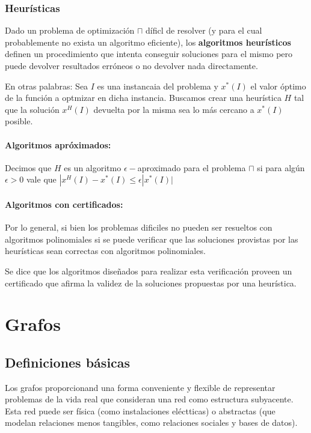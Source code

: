 \subsubsection{Heurísticas}
Dado un problema de optimización \(\sqcap\) díficl de resolver (y para el cual probablemente no exista un algoritmo eficiente), los \textbf{algoritmos heurísticos} definen un procedimiento que intenta conseguir soluciones para el mismo pero puede devolver resultados erróneos o no devolver nada directamente.

En otras palabras: Sea \(I\) es una instancaia del problema y \(x^*(I)\) el valor óptimo de la función a optmizar en dicha instancia. Buscamos crear una heurística \(H\) tal que la solución \(x^H(I)\) devuelta por la misma sea lo más cercano a \(x^*(I)\) posible.

\paragraph{Algoritmos apróximados:} Decimos que \(H\) es un algoritmo \(\epsilon-\)aproximado para el problema \(\sqcap\) si para algún \(\epsilon > 0\) vale que \(|x^H(I) - x^*(I)\leq\epsilon|x^*(I)|\)

\paragraph{Algoritmos con certificados:} Por lo general, si bien los problemas dificiles no pueden ser resueltos con algoritmos polinomiales si se puede verificar que las soluciones provistas por las heurísticas sean correctas con algoritmos polinomiales. 

Se dice que los algoritmos diseñados para realizar esta verificación proveen un certificado que afirma la validez de la soluciones propuestas por una heurística.

\printbibliography[keyword=intro,title={Bibliografía}]

\newpage
\section{Grafos}
\subsection{Definiciones básicas}
Los grafos proporcionand una forma conveniente y flexible de representar problemas de la vida real que consideran una red como estructura subyacente. Esta red puede ser física (como instalaciones eléctticas) o abstractas (que modelan relaciones menos tangibles, como relaciones sociales y bases de datos).

